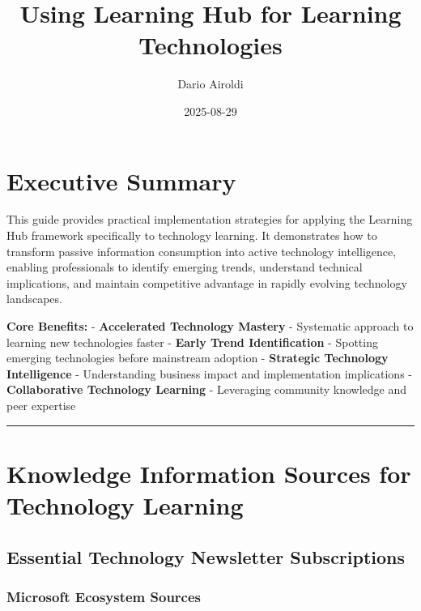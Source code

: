 \documentclass[
  letterpaper,
  DIV=11,
  numbers=noendperiod]{scrartcl}
\title{Using Learning Hub for Learning Technologies}
\author{Dario Airoldi}
\date{2025-08-29}
\renewcommand*\contentsname{Table of contents}
\newcommand\contentsname{Table of contents}
\begin{document}
\maketitle

\renewcommand*\contentsname{Table of contents}
{
\hypersetup{linkcolor=}
\setcounter{tocdepth}{3}
\tableofcontents
}

\section{Executive Summary}\label{executive-summary}

This guide provides practical implementation strategies for applying the
Learning Hub framework specifically to technology learning. It
demonstrates how to transform passive information consumption into
active technology intelligence, enabling professionals to identify
emerging trends, understand technical implications, and maintain
competitive advantage in rapidly evolving technology landscapes.

\textbf{Core Benefits:} - \textbf{Accelerated Technology Mastery} -
Systematic approach to learning new technologies faster - \textbf{Early
Trend Identification} - Spotting emerging technologies before mainstream
adoption - \textbf{Strategic Technology Intelligence} - Understanding
business impact and implementation implications - \textbf{Collaborative
Technology Learning} - Leveraging community knowledge and peer expertise

\begin{center}\rule{0.5\linewidth}{0.5pt}\end{center}

\section{Knowledge Information Sources for Technology
Learning}\label{knowledge-information-sources-for-technology-learning}

\subsection{Essential Technology Newsletter
Subscriptions}\label{essential-technology-newsletter-subscriptions}

\subsubsection{Microsoft Ecosystem
Sources}\label{microsoft-ecosystem-sources}
\end{document}
